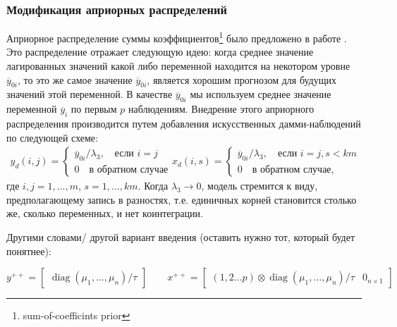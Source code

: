 \documentclass[11pt]{article} %
\DeclareMathOperator{\diag}{diag}
\newcommand{\post}{\overline}
\begin{document}
\subsubsection*{Модификация априорных распределений}

Априорное распределение суммы коэффициентов\footnote{sum-of-coefficints prior} было предложено в работе  \cite{doan_litterman_sims_1984_forecasting}. Это распределение отражает следующую идею:
когда среднее значение лагированных значений какой либо переменной находится на некотором уровне $\post y_{0i}$, то это же самое значение  $\post y_{0i}$, является хорошим прогнозом  для будущих значений этой переменной. В качестве  $\post y_{0i}$ мы используем среднее значение переменной  $\post y_{i}$ по первым  $p$ наблюдениям. Внедрение этого априорного распределения производится путем добавления искусственных дамми-наблюдений по следующей схеме:
\begin{gather*}
y_d(i,j)=\begin{cases}
\post y_{0i}/\lambda_3, \quad \text{если }i=j\\
0 \quad \text{в обратном случае}
\end{cases}
x_d(i,s)=\begin{cases}
\post y_{0i}/\lambda_3,\quad \text{если }i=j, s<km\\
0 \quad \text{в обратном случае,}
\end{cases}
\end{gather*}
где $i,j=1,\ldots,m$, $s=1, \ldots, km$. Когда $\lambda_3\to 0$, модель стремится к виду, предполагающему запись в разностях, т.е. единичных корней становится столько же, сколько переменных, и нет коинтеграции.

Другими словами/ другой вариант введения (оставить нужно тот, который будет понятнее):

\begin{equation}
y^{++}=\begin{bmatrix}\diag(\mu_1,\ldots,\mu_n)/\tau\end{bmatrix}\qquad
x^{++}=\begin{bmatrix}(1,2\ldots p)\otimes \diag(\mu_1,\ldots,\mu_n)/\tau &0_{n\times 1}\end{bmatrix}
\end{equation}
\end{document}
